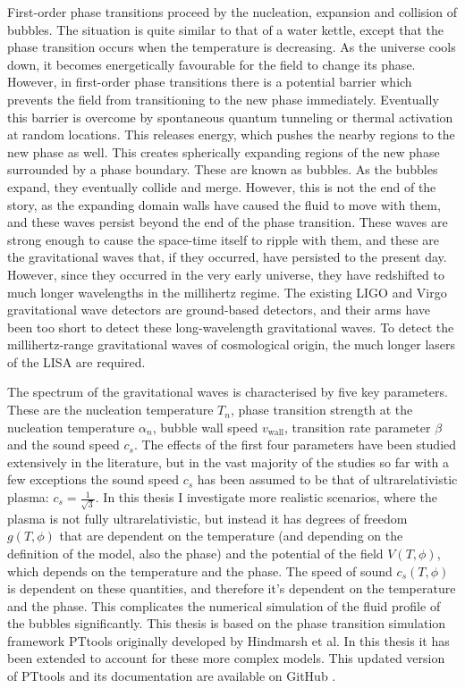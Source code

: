 First-order phase transitions proceed by the nucleation, expansion and collision of bubbles.
The situation is quite similar to that of a water kettle,
except that the phase transition occurs when the temperature is decreasing.
As the universe cools down,
it becomes energetically favourable for the field to change its phase.
However, in first-order phase transitions there is a potential barrier which prevents the field from transitioning to the new phase immediately.
Eventually this barrier is overcome by spontaneous quantum tunneling or thermal activation at random locations.
This releases energy, which pushes the nearby regions to the new phase as well.
This creates spherically expanding regions of the new phase surrounded by a phase boundary.
These are known as bubbles.
As the bubbles expand, they eventually collide and merge.
However, this is not the end of the story,
as the expanding domain walls have caused the fluid to move with them,
and these waves persist beyond the end of the phase transition.
These waves are strong enough to cause the space-time itself to ripple with them,
and these are the gravitational waves that, if they occurred, have persisted to the present day.
However, since they occurred in the very early universe, they have redshifted to much longer wavelengths in the millihertz regime.
The existing LIGO and Virgo gravitational wave detectors are ground-based detectors,
and their arms have been too short to detect these long-wavelength gravitational waves.
To detect the millihertz-range gravitational waves of cosmological origin, the much longer lasers of the LISA are required.
\cites{lecture_notes}{hindmarsh_gw_pt_2019}{mazumdar_review_2019}

The spectrum of the gravitational waves is characterised by five key parameters.
These are the nucleation temperature $T_n$,
phase transition strength at the nucleation temperature $\alpha_n$,
bubble wall speed $v_{\text{wall}}$,
transition rate parameter $\beta$
and the sound speed $c_s$.
\cite{lecture_notes}
The effects of the first four parameters have been studied extensively in the literature,
but in the vast majority of the studies so far with a few exceptions
\cites{leitao_hydrodynamics_2015}{giese_2020}{giese_2021}{tenkanen_speed_2022}{tian_gw_2024}
the sound speed $c_s$ has been assumed to be that of ultrarelativistic plasma: $c_s = \frac{1}{\sqrt{3}}$.
In this thesis I investigate more realistic scenarios, where the plasma is not fully ultrarelativistic,
but instead it has degrees of freedom $g(T,\phi)$ that are dependent on the temperature (and depending on the definition of the model, also the phase) and the potential of the field $V(T,\phi)$,
which depends on the temperature and the phase.
The speed of sound $c_s(T,\phi)$ is dependent on these quantities,
and therefore it's dependent on the temperature and the phase.
This complicates the numerical simulation of the fluid profile of the bubbles significantly.
\cites{leitao_hydrodynamics_2015}{giese_2020}{giese_2021}
This thesis is based on the phase transition simulation framework PTtools originally developed by Hindmarsh et al.
In this thesis it has been extended to account for these more complex models.
This updated version of PTtools and its documentation are available on GitHub \cite{pttools}.

